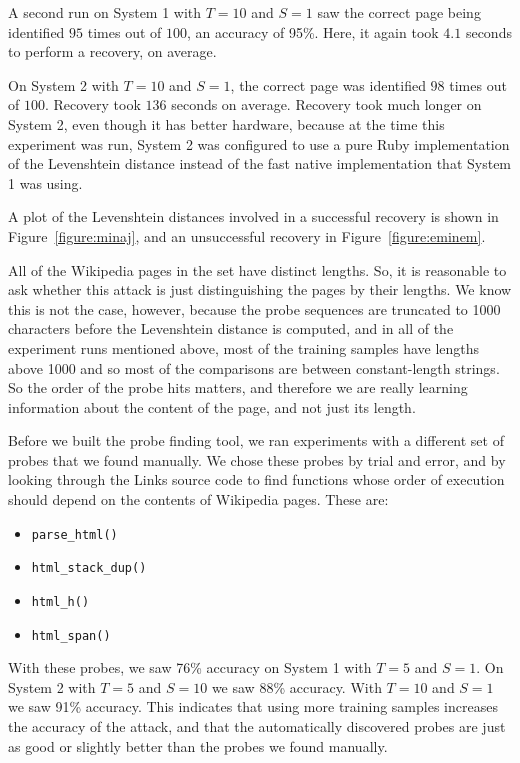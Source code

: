 \documentclass[letterpaper,twocolumn,10pt]{article}
\begin{document}
A second run on System 1 with $T=10$ and $S=1$ saw the
correct page being identified $95$ times out of $100$, an accuracy of 95\%.
Here, it again took $4.1$ seconds to perform a recovery, on average.

On System 2 with $T=10$ and $S=1$, the correct page was
identified $98$ times out of $100$. Recovery took $136$ seconds on average.
Recovery took much longer on System 2, even though it has better hardware,
because at the time this experiment was run, System 2 was configured to use
a pure Ruby implementation of the Levenshtein distance instead of the fast
native implementation that System 1 was using.

A plot of the Levenshtein distances involved in a successful recovery is shown
in Figure~\ref{figure:minaj}, and an unsuccessful recovery in
Figure~\ref{figure:eminem}.

All of the Wikipedia pages in the set have distinct lengths. So, it is
reasonable to ask whether this attack is just distinguishing the pages by their
lengths. We know this is not the case, however, because the probe sequences are
truncated to 1000 characters before the Levenshtein distance is computed, and in
all of the experiment runs mentioned above, most of the training samples have
lengths above 1000 and so most of the comparisons are between constant-length
strings. So the order of the probe hits matters, and therefore we are really
learning information about the content of the page, and not just its length.

Before we built the probe finding tool, we ran experiments with a different set
of probes that we found manually. We chose these probes by trial and error, and
by looking through the Links source code to find functions whose order of
execution should depend on the contents of Wikipedia pages. These are:

\begin{itemize}
    \item \texttt{parse\_html()}
    \item \texttt{html\_stack\_dup()}
    \item \texttt{html\_h()}
    \item \texttt{html\_span()}
\end{itemize}

With these probes, we saw 76\% accuracy on System 1 with $T=5$ and
$S=1$. On System 2 with $T=5$
and $S=10$ we saw 88\% accuracy. With $T=10$ and
$S=1$ we saw 91\% accuracy. This indicates that using
more training samples increases the accuracy of the attack, and that the
automatically discovered probes are just as good or slightly better than the
probes we found manually.
\end{document}
